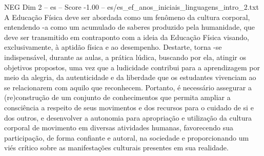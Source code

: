 \begin{textsample}{NEG Dim 2 – es – Score -1.00 – es/es\_ef\_anos\_iniciais\_linguagens\_intro\_2.txt}
A Educação Física deve ser abordada como um fenômeno da cultura corporal, entendendo -a como um acumulado de saberes produzido pela humanidade, que deve ser transmitido em contraponto com a ideia da Educação Física visando, exclusivamente, à aptidão física e ao desempenho.
Destarte, torna -se indispensável, durante as aulas, a prática lúdica, buscando por ela, atingir os objetivos propostos, uma vez que a ludicidade contribui para a aprendizagem por meio da alegria, da autenticidade e da liberdade que os estudantes vivenciam ao se relacionarem com aquilo que reconhecem.
Portanto, é necessário assegurar a (re)construção de um conjunto de conhecimentos que permita ampliar a consciência a respeito de seus movimentos e dos recursos para o cuidado de si e dos outros, e desenvolver a autonomia para apropriação e utilização da cultura corporal de movimento em diversas atividades humanas, favorecendo sua participação, de forma confiante e autoral, na sociedade e proporcionando um viés crítico sobre as manifestações culturais presentes em sua realidade.

\end{textsample}
